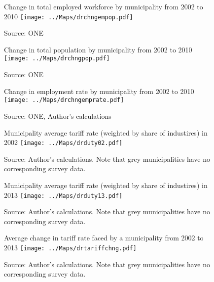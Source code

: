 \begin{landscape}
\begin{figure}[H]
\begin{center}
Change in total employed workforce by municipality from 2002 to 2010
\texttt{[image: ../Maps/drchngempop.pdf]}
\caption{\label{fig:Map4}}
Source: ONE
\end{center}
\end{figure}

\begin{figure}[H]
\begin{center}
Change in total population by municipality from 2002 to 2010
\texttt{[image: ../Maps/drchngpop.pdf]}
\caption{\label{fig:Map5}}
Source: ONE
\end{center}
\end{figure}

\begin{figure}[H]
\begin{center}
Change in employment rate by municipality from 2002 to 2010
\texttt{[image: ../Maps/drchngemprate.pdf]}
\caption{\label{fig:Map6}}
Source: ONE, Author's calculations
\end{center}
\end{figure}

\begin{figure}[H]
\begin{center}
Municipality average tariff rate (weighted by share of industires) in 2002
\texttt{[image: ../Maps/drduty02.pdf]}
\caption{\label{fig:Map1}}
Source: Author's calculations. Note that grey municipalities have no corresponding survey data.
\end{center}
\end{figure}

\begin{figure}[H]
\begin{center}
Municipality average tariff rate (weighted by share of industires) in 2013
\texttt{[image: ../Maps/drduty13.pdf]}
\caption{\label{fig:Map2}}
Source: Author's calculations. Note that grey municipalities have no corresponding survey data.
\end{center}
\end{figure}

\begin{figure}[H]
\begin{center}
Average change in tariff rate faced by a municipality from 2002 to 2013
\texttt{[image: ../Maps/drtariffchng.pdf]}
\caption{\label{fig:Map3}}
Source: Author's calculations. Note that grey municipalities have no corresponding survey data.
\end{center}
\end{figure}
\end{landscape}